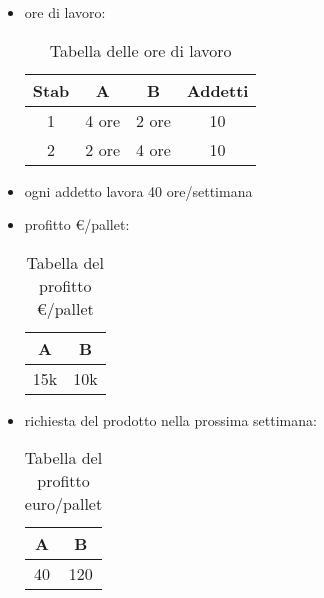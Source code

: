 \begin{itemize}
	\item ore di lavoro:

	\begin{table}[h!]
		\begin{center}
			\begin{tabular}{|c | c c c|} 
 				\hline
 				Stab & A & B & Addetti \\ [0.5ex]
 				\hline
	 			1 & 4 ore & 2 ore & 10 \\
 				2 & 2 ore & 4 ore & 10 \\
				\hline
			\end{tabular}
		\end{center}
		\caption{Tabella delle ore di lavoro}
		\label{taborelav}
	\end{table}

	\item ogni addetto lavora 40 ore/settimana
	
	\item profitto €/pallet:
	
	\begin{table}[h!]
		\begin{center}
			\begin{tabular}{| c c|} 
 				\hline
 				A & B \\ [0.5ex]
 				\hline
 				15k & 10k \\
				\hline
			\end{tabular}
		\end{center}
		\caption{Tabella del profitto €/pallet}
		\label{tabprof}
	\end{table}
	
	\item richiesta del prodotto nella prossima settimana:
	
	\begin{table}[h!]
		\begin{center}
			\begin{tabular}{| c c|} 
 				\hline
 				A & B \\ [0.5ex]
 				\hline
 				40 & 120 \\
				\hline
			\end{tabular}
		\end{center}
		\caption{Tabella del profitto euro/pallet}
		\label{tabprof}
	\end{table}

\end{itemize}



